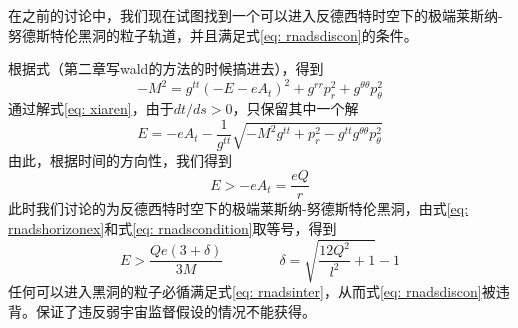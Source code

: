 在之前的讨论中，我们现在试图找到一个可以进入反德西特时空下的极端莱斯纳-努德斯特伦黑洞的粒子轨道，并且满足式\eqref{eq: rnadsdiscon}的条件。

根据式（第二章写wald的方法的时候搞进去），得到
\begin{equation}\label{eq: xiaren}
    -M^2=g^{tt}\left(-E-eA_t\right)^2+g^{rr}p_r^2+g^{\theta \theta}p_\theta ^2
\end{equation}
通过解式\eqref{eq: xiaren}，由于$dt/ds>0$，只保留其中一个解
\begin{equation}
    E=-eA_t -\frac{1}{g^{tt}}\sqrt{-M^2g^{tt}+p_r^2-g^{tt}g^{\theta \theta}p_{\theta}^2}
\end{equation}
由此，根据时间的方向性，我们得到
\begin{equation}
    E>-eA_t=\frac{eQ}{r}
\end{equation}
此时我们讨论的为反德西特时空下的极端莱斯纳-努德斯特伦黑洞，由式\eqref{eq: rnadshorizonex}和式\eqref{eq: rnadscondition}取等号，得到
\begin{equation}\label{eq: rnadsinter}
    E> \frac{Qe\left(3+\delta\right)}{3M} \qquad\qquad  \delta= \sqrt{\frac{12 Q^2}{l^2}+1}-1
\end{equation}
任何可以进入黑洞的粒子必循满足式\eqref{eq: rnadsinter}，从而式\eqref{eq: rnadsdiscon}被违背。保证了违反弱宇宙监督假设的情况不能获得。

